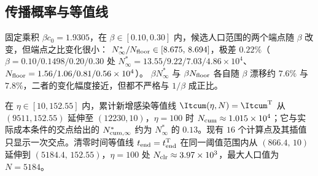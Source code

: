 \FloatBarrier
\subsection{传播概率与等值线}
\label{app:dom:numerics}
固定乘积 $\beta c_0=1.9305$，在 $\beta\in[0.10,0.30]$ 内，候选人口范围的两个端点随 $\beta$ 改变，但端点之比变化很小：
$N^\ast_\infty/N_{\rm floor}\in[8.675,\,8.694]$，极差 $0.22\%$（$\beta=0.10/0.1498/0.20/0.30$ 处
$N^\ast_\infty=13.55/9.22/7.03/4.86\times10^4$、$N_{\rm floor}=1.56/1.06/0.81/0.56\times10^4$）。
$\beta N^\ast_\infty$ 与 $\beta N_{\rm floor}$ 各自随 $\beta$ 漂移约 $7.6\%$ 与 $7.8\%$，二者的变化幅度接近，但都不严格与 $1/\beta$ 成正比。

在 $\eta\in[10,152.55]$ 内，累计新增感染等值线 $\Itcum(\eta,N)=\Itcum^{\rm T}$ 从 $(9511,152.55)$ 延伸至 $(12230,10)$，$\eta=100$ 时 $N_{\rm cum}\approx1.015\times10^4$；它与实际成本条件的交点给出的 $N_{\rm cum,\infty}^\ast$ 约为 $N^\ast_\infty$ 的 $0.13$。现有 $16$ 个计算点及其插值只显示一次交点。清零时间等值线 $t_{\rm end}=t_{\rm end}^{\rm T}$ 在同一阈值范围内从 $(866.4,\,10)$ 延伸到 $(5184.4,\,152.55)$，$\eta=100$ 处 $N_{\rm clr}\approx3.97\times10^{3}$，最大人口值为 $N=5184$。
